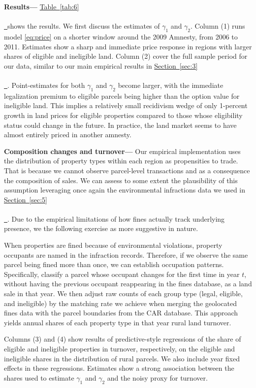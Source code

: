 \documentclass[12pt]{article}
\newcommand*{\tabref}[2][]{%
  \hyperref[{tab:#2}]{%
    Table~\ref*{tab:#2}%
    \ifx\\#1\\%
    \else
      \,#1%
    \fi
  }%
}
\newcommand*{\sectionref}[2][]{%
  \hyperref[{sec:#2}]{%
    Section~\ref*{sec:#2}%
    \ifx\\#1\\%
    \else
      \,#1%
    \fi
  }%
}
\begin{document}
\quad \textbf{Results---} \tabref{6} shows the results. We first discuss the estimates of $\gamma_1$ and $\gamma_2$. Column (1) runs model \eqref{eq:price} on a shorter window around the 2009 Amnesty, from 2006 to 2011. Estimates show a sharp and immediate price response in regions with larger shares of eligible and ineligible land. Column (2) cover the full sample period for our data, similar to our main empirical results in \sectionref{3}. Point-estimates for both $\gamma_1$ and $\gamma_2$ become larger, with the immediate legalization premium to eligible parcels being higher than the option value for ineligible land. This implies a relatively small recidivism wedge of only 1-percent growth in land prices for eligible properties compared to those whose eligibility status could change in the future. In practice, the land market seems to have almost entirely priced in another amnesty.  
\ 

\quad \textbf{Composition changes and turnover---} Our empirical implementation uses the distribution of property types within each region as propensities to trade. That is because we cannot observe parcel-level transactions and as a consequence the composition of sales. We can assess to some extent the plausibility of this assumption leveraging once again the environmental infractions data we used in \sectionref{5}. Due to the empirical limitations of how fines actually track underlying presence, we the following exercise as more suggestive in nature.
\ 

\quad When properties are fined because of environmental violations, property occupants are named in the infraction records. Therefore, if we observe the same parcel being fined more than once, we can establish occupation patterns. Specifically, classify a parcel whose occupant changes for the first time in year $t$, without having the previous occupant reappearing in the fines database, as a land sale in that year. We then adjust raw counts of each group type (legal, eligible, and ineligible) by the matching rate we achieve when merging the geolocated fines data with the parcel boundaries from the CAR database. This approach yields annual shares of each property type in that year rural land turnover.
\ 

\quad Columns (3) and (4) show results of predictive-style regressions of the share of eligible and ineligible properties in turnover, respectively, on the eligible and ineligible shares in the distribution of rural parcels. We also include year fixed effects in these regressions. Estimates show a strong association between the shares used to estimate $\gamma_1$ and $\gamma_2$ and the noisy proxy for turnover. 
\end{document}
